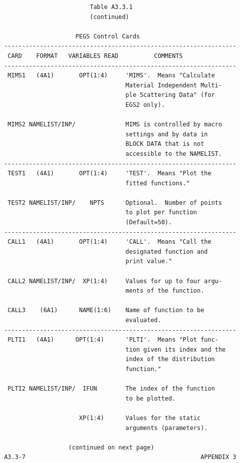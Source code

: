 \newpage {} \begin{verbatim}
                         Table A3.3.1
                         (continued)

                     PEGS Control Cards
 -----------------------------------------------------------------
  CARD    FORMAT   VARIABLES READ          COMMENTS
 -----------------------------------------------------------------
  MIMS1   (4A1)       OPT(1:4)     'MIMS'.  Means "Calculate
                                   Material Independent Multi-
                                   ple Scattering Data" (for
                                   EGS2 only).

  MIMS2 NAMELIST/INP/              MIMS is controlled by macro
                                   settings and by data in
                                   BLOCK DATA that is not
                                   accessible to the NAMELIST.
 -----------------------------------------------------------------
  TEST1   (4A1)       OPT(1:4)     'TEST'.  Means "Plot the
                                   fitted functions."

  TEST2 NAMELIST/INP/    NPTS      Optional.  Number of points
                                   to plot per function
                                   (Default=50).
 -----------------------------------------------------------------
  CALL1   (4A1)       OPT(1:4)     'CALL'.  Means "Call the
                                   designated function and
                                   print value."

  CALL2 NAMELIST/INP/  XP(1:4)     Values for up to four argu-
                                   ments of the function.

  CALL3    (6A1)      NAME(1:6)    Name of function to be
                                   evaluated.
 -----------------------------------------------------------------
  PLTI1   (4A1)      OPT(1:4)      'PLTI'.  Means "Plot func-
                                   tion given its index and the
                                   index of the distribution
                                   function."

  PLTI2 NAMELIST/INP/  IFUN        The index of the function
                                   to be plotted.

                      XP(1:4)      Values for the static
                                   arguments (parameters).

                   (continued on next page)
 A3.3-7                                                 APPENDIX 3
\end{verbatim}
